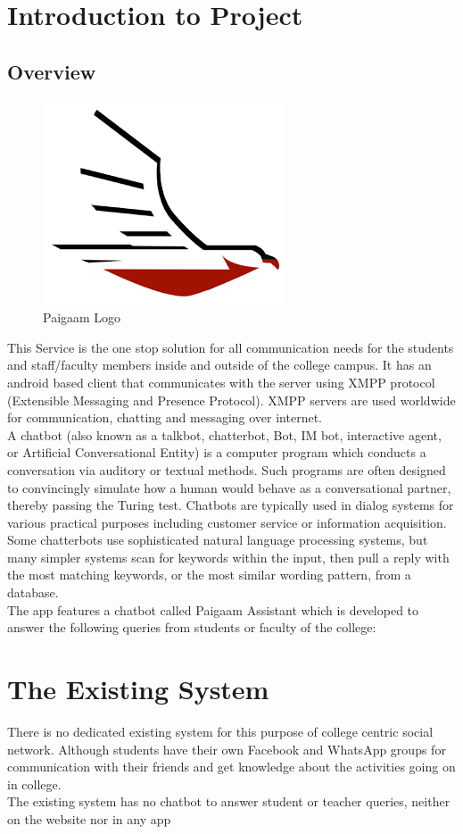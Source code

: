 \section{Introduction to Project}
\subsection{Overview}
\begin{figure}[ht]
\centering
\includegraphics[scale=0.5]{input/images/paigaam.png}
\caption{Paigaam Logo}
\end{figure}
This Service is the one stop solution for all communication needs for the students and staff/faculty members
inside and outside of the college campus. It has an android based client that communicates with the server
using XMPP protocol (Extensible Messaging and Presence Protocol). XMPP servers are used worldwide
for communication, chatting and messaging over internet.\\

\noindent A chatbot (also known as a talkbot, chatterbot, Bot, IM bot, interactive agent, or Artificial Conversational
Entity) is a computer program which conducts a conversation via auditory or textual methods. Such
programs are often designed to convincingly simulate how a human would behave as a conversational
partner, thereby passing the Turing test. Chatbots are typically used in dialog systems for various practical
purposes including customer service or information acquisition. Some chatterbots use sophisticated natural
language processing systems, but many simpler systems scan for keywords within the input, then pull a
reply with the most matching keywords, or the most similar wording pattern, from a database.
\\
\noindent The app features a chatbot called Paigaam Assistant which is developed to answer the following queries
from students or faculty of the college:

\section{The Existing System}
There is no dedicated existing system for this purpose of college centric social network. Although students
have their own Facebook and WhatsApp groups for communication with their friends and get knowledge
about the activities going on in college.\\
\noindent The existing system has no chatbot to answer student or teacher queries, neither on the website nor in any
app

